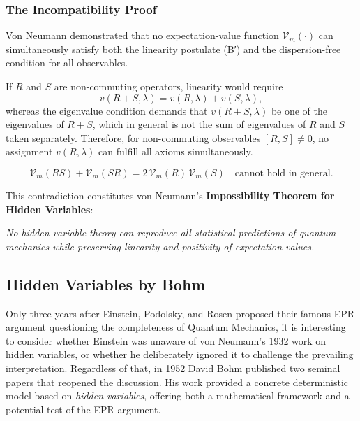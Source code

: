 \vspace{0.3cm}

\subsubsection*{The Incompatibility Proof}

Von Neumann demonstrated that no expectation-value function $\mathcal{V}_m(\cdot)$ can simultaneously satisfy both the linearity postulate (B′) and the dispersion-free condition for all observables.

If $R$ and $S$ are non-commuting operators, linearity would require
\begin{equation}
    v(R + S,\lambda) = v(R,\lambda) + v(S,\lambda),
\end{equation}
whereas the eigenvalue condition demands that $v(R + S,\lambda)$ be one of the eigenvalues of $R + S$, which in general is not the sum of eigenvalues of $R$ and $S$ taken separately.  
Therefore, for non-commuting observables $[R,S]\neq 0$, no assignment $v(R,\lambda)$ can fulfill all axioms simultaneously.

\begin{equation}
    \mathcal{V}_m(RS) + \mathcal{V}_m(SR) = 2\,\mathcal{V}_m(R)\,\mathcal{V}_m(S)
    \quad \text{cannot hold in general.}
\end{equation}

This contradiction constitutes von Neumann’s \textbf{Impossibility Theorem for Hidden Variables}:  
\begin{center}
\emph{No hidden-variable theory can reproduce all statistical predictions of quantum mechanics while preserving linearity and positivity of expectation values.}
\end{center}

\subsection{Hidden Variables by Bohm} 

Only three years after Einstein, Podolsky, and Rosen proposed their famous EPR argument questioning the completeness of Quantum Mechanics, it is interesting to consider whether Einstein was unaware of von Neumann’s 1932 work on hidden variables, or whether he deliberately ignored it to challenge the prevailing interpretation.  
Regardless of that, in 1952 David Bohm published two seminal papers that reopened the discussion.  
His work provided a concrete deterministic model based on \textit{hidden variables}, offering both a mathematical framework and a potential test of the EPR argument.

